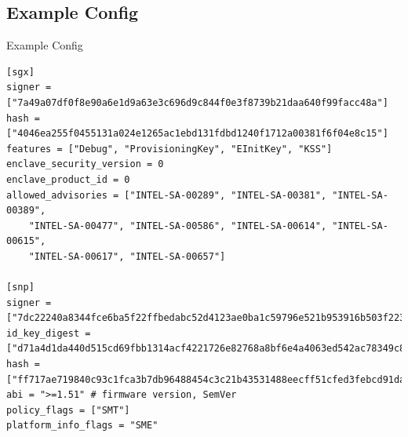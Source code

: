 \documentclass[graphics,compress]{beamer}
\begin{document}
\subsection{Example Config}
\begin{frame}[fragile]{Example Config}
    \begin{verbatim}
[sgx]
signer = ["7a49a07df0f8e90a6e1d9a63e3c696d9c844f0e3f8739b21daa640f99facc48a"]
hash = ["4046ea255f0455131a024e1265ac1ebd131fdbd1240f1712a00381f6f04e8c15"]
features = ["Debug", "ProvisioningKey", "EInitKey", "KSS"]
enclave_security_version = 0
enclave_product_id = 0
allowed_advisories = ["INTEL-SA-00289", "INTEL-SA-00381", "INTEL-SA-00389",
    "INTEL-SA-00477", "INTEL-SA-00586", "INTEL-SA-00614", "INTEL-SA-00615",
    "INTEL-SA-00617", "INTEL-SA-00657"]

[snp]
signer = ["7dc22240a8344fce6ba5f22ffbedabc52d4123ae0ba1c59796e521b953916b503f223b15c4429e7d8c5489ad71f1e193"]
id_key_digest = ["d71a4d1da440d515cd69fbb1314acf4221726e82768a8bf6e4a4063ed542ac78349c8145b4666a4242a91a374387b473"]
hash = ["ff717ae719840c93c1fca3b7db96488454c3c21b43531488eecff51cfed3febcd91da8be87a4cbcbc52a3bae770987c3"]
abi = ">=1.51" # firmware version, SemVer
policy_flags = ["SMT"]
platform_info_flags = "SME"
    \end{verbatim}
\end{frame}
\end{document}
